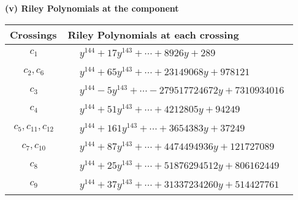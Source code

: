 \documentclass[1p]{elsarticle_modified}
\theoremstyle{definition}
\begin{document}
\newpage\renewcommand{\arraystretch}{1}
\flushleft \textbf{(v) Riley Polynomials at the component}\newline \\
\begin{tabular}{m{50pt}|m{274pt}}
Crossings & \hspace{64pt}Riley Polynomials at each crossing \\
\hline $$\begin{aligned}c_{1}\end{aligned}$$&$\begin{aligned}
&y^{144}+17 y^{143}+\cdots+8926 y+289
\end{aligned}$\\
\hline $$\begin{aligned}c_{2},c_{6}\end{aligned}$$&$\begin{aligned}
&y^{144}+65 y^{143}+\cdots+23149068 y+978121
\end{aligned}$\\
\hline $$\begin{aligned}c_{3}\end{aligned}$$&$\begin{aligned}
&y^{144}-5 y^{143}+\cdots-279517724672 y+7310934016
\end{aligned}$\\
\hline $$\begin{aligned}c_{4}\end{aligned}$$&$\begin{aligned}
&y^{144}+51 y^{143}+\cdots+4212805 y+94249
\end{aligned}$\\
\hline $$\begin{aligned}c_{5},c_{11},c_{12}\end{aligned}$$&$\begin{aligned}
&y^{144}+161 y^{143}+\cdots+3654383 y+37249
\end{aligned}$\\
\hline $$\begin{aligned}c_{7},c_{10}\end{aligned}$$&$\begin{aligned}
&y^{144}+87 y^{143}+\cdots+4474494936 y+121727089
\end{aligned}$\\
\hline $$\begin{aligned}c_{8}\end{aligned}$$&$\begin{aligned}
&y^{144}+25 y^{143}+\cdots+51876294512 y+806162449
\end{aligned}$\\
\hline $$\begin{aligned}c_{9}\end{aligned}$$&$\begin{aligned}
&y^{144}+37 y^{143}+\cdots+31337234260 y+514427761
\end{aligned}$\\
\hline
\end{tabular}\\~\\
\end{document}
